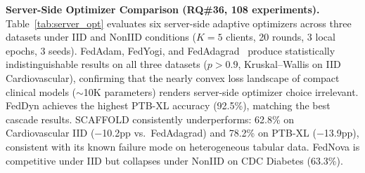 \documentclass[conference]{IEEEtran}
\begin{document}
\smallskip\noindent\textbf{Server-Side Optimizer Comparison (RQ\#36, 108 experiments).}
Table~\ref{tab:server_opt} evaluates six server-side adaptive optimizers across three datasets under IID and NonIID conditions ($K{=}5$ clients, 20 rounds, 3 local epochs, 3 seeds). FedAdam, FedYogi, and FedAdagrad~\cite{reddi2021adaptive} produce statistically indistinguishable results on all three datasets ($p{>}0.9$, Kruskal--Wallis on IID Cardiovascular), confirming that the nearly convex loss landscape of compact clinical models ($\sim$10K parameters) renders server-side optimizer choice irrelevant. FedDyn achieves the highest PTB-XL accuracy (92.5\%), matching the best cascade results. SCAFFOLD consistently underperforms: 62.8\% on Cardiovascular IID ($-$10.2pp vs.\ FedAdagrad) and 78.2\% on PTB-XL ($-$13.9pp), consistent with its known failure mode on heterogeneous tabular data. FedNova is competitive under IID but collapses under NonIID on CDC Diabetes (63.3\%).
\end{document}
